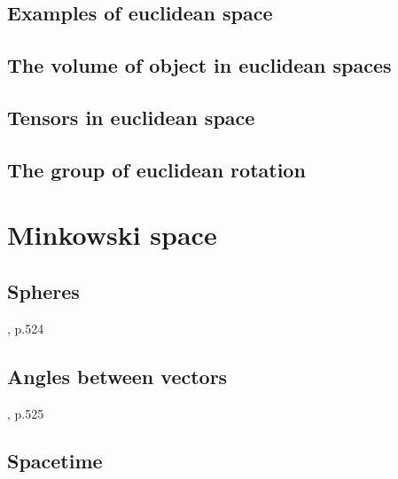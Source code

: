 \documentclass{book}
\begin{document}
\section{Examples of euclidean space}

\section{The volume of object in euclidean spaces}

\section{Tensors in euclidean space}

\section{The group of euclidean rotation}

\chapter{Minkowski space}

\section{Spheres}

\cite{rosenfeld_noneucldean}, p.524

\section{Angles between vectors}

\cite{rosenfeld_noneucldean}, p.525

\section{Spacetime}
\end{document}
